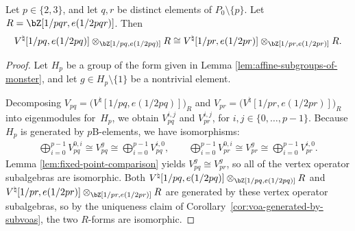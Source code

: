 \begin{prop} \label{prop:isomorphisms-of-forms-for-2-and-3}Let $p \in \{2,3\}$, and let $q,r$ be distinct elements of $P_0 \setminus \{p\}$. Let $R = \bZ[1/pqr, e(1/2pqr)]$. Then
\begin{gather*} V^\natural[1/pq, e(1/2pq)] \otimes_{\bZ[1/pq, e(1/2pq)]} R \cong V^\natural[1/pr, e(1/2pr)] \otimes_{\bZ[1/pr, e(1/2pr)]} R. \end{gather*}
\end{prop}
\begin{proof}Let $H_p$ be a group of the form given in Lemma \ref{lem:affine-subgroups-of-monster}, and let $g \in H_p \setminus \{1\}$ be a nontrivial element.

Decomposing $V_{pq} = \big(V^\natural[1/pq,e(1/2pq)]\big)_R$ and $V_{pr} = \big(V^\natural[1/pr,e(1/2pr)]\big)_R$ into eigenmodules for~$H_p$, we obtain $V_{pq}^{i,j}$ and $V_{pr}^{i,j}$, for $i,j \in \{0,\ldots,p-1\}$. Because $H_p$ is generated by $p$B-elements, we have isomorphisms:
\begin{gather*}
\bigoplus_{i=0}^{p-1} V_{pq}^{0,i} \cong V_{pq}^g \cong \bigoplus_{i=0}^{p-1} V_{pq}^{i,0},\qquad
\bigoplus_{i=0}^{p-1} V_{pr}^{0,i} \cong V_{pr}^g \cong \bigoplus_{i=0}^{p-1} V_{pr}^{i,0}.
\end{gather*}
Lemma \ref{lem:fixed-point-comparison} yields $V_{pq}^g \cong V_{pr}^g$, so all of the vertex operator subalgebras are isomorphic. Both $V^\natural[1/pq, e(1/2pq)] \otimes_{\bZ[1/pq, e(1/2pq)]} R$ and $V^\natural[1/pr, e(1/2pr)] \otimes_{\bZ[1/pr, e(1/2pr)]} R$ are generated by these vertex operator subalgebras, so by the uniqueness claim of Corollary~\ref{cor:voa-generated-by-subvoas}, the two $R$-forms are isomorphic.
\end{proof}

